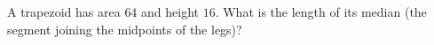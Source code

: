 A trapezoid has area $64$ and height $16$. What is the length of its median (the segment joining the midpoints of the legs)?

